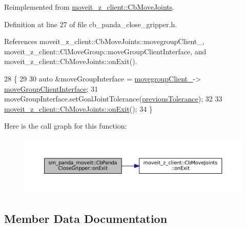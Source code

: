 Reimplemented from \hyperlink{classmoveit__z__client_1_1CbMoveJoints_a104abb9c8f8ebb04a6e5c8e84b473add}{moveit\+\_\+z\+\_\+client\+::\+Cb\+Move\+Joints}.



Definition at line 27 of file cb\+\_\+panda\+\_\+close\+\_\+gripper.\+h.



References moveit\+\_\+z\+\_\+client\+::\+Cb\+Move\+Joints\+::movegroup\+Client\+\_\+, moveit\+\_\+z\+\_\+client\+::\+Cl\+Move\+Group\+::move\+Group\+Client\+Interface, and moveit\+\_\+z\+\_\+client\+::\+Cb\+Move\+Joints\+::on\+Exit().


\begin{DoxyCode}
28     \{
29 
30         \textcolor{keyword}{auto} &moveGroupInterface = \hyperlink{classmoveit__z__client_1_1CbMoveJoints_a2ce2e613b676025766dcd2f01ae50810}{movegroupClient\_}->
      \hyperlink{classmoveit__z__client_1_1ClMoveGroup_af86e046b837be0ef4afa9893d8808f20}{moveGroupClientInterface};
31         moveGroupInterface.setGoalJointTolerance(\hyperlink{classsm__panda__moveit_1_1CbPandaCloseGripper_adb4d41d62eb40ca626f9d21bbec147a0}{previousTolerance});
32 
33         \hyperlink{classmoveit__z__client_1_1CbMoveJoints_a104abb9c8f8ebb04a6e5c8e84b473add}{moveit\_z\_client::CbMoveJoints::onExit}();
34     \}
\end{DoxyCode}
Here is the call graph for this function\+:
\nopagebreak
\begin{figure}[H]
\begin{center}
\leavevmode
\includegraphics[width=350pt]{classsm__panda__moveit_1_1CbPandaCloseGripper_a0a51d63684baaba9d33fe272db237593_cgraph}
\end{center}
\end{figure}


\subsection{Member Data Documentation}
\mbox{\label{classsm__panda__moveit_1_1CbPandaCloseGripper_adb4d41d62eb40ca626f9d21bbec147a0}} 
